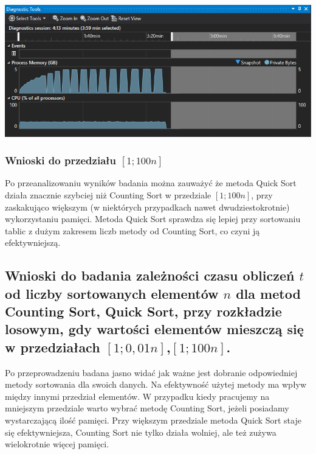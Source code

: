 \documentclass[polish,polish,a4paper]{article}
\begin{document}
\begin{spacing}{1.5}
\begin{minipage}[H]{\textwidth}
	\begin{center}
		\includegraphics[scale=0.85]{zad4pamiec100n.png}
		\label{fig:zad4pamiec100n}
	\end{center}
\end{minipage}



\subsubsection{Wnioski do przedziału $[1;100n]$}

Po przeanalizowaniu wyników badania można zauważyć że metoda Quick Sort działa znacznie szybciej niż Counting Sort w przedziale $[1;100n]$, przy zaskakująco większym (w niektórych przypadkach nawet dwudziestokrotnie) wykorzystaniu pamięci. Metoda Quick Sort sprawdza się lepiej przy sortowaniu tablic z dużym zakresem liczb metody od Counting Sort, co czyni ją efektywniejszą.


\subsection{Wnioski do badania zależności czasu obliczeń $t$ od liczby sortowanych elementów $n$ dla metod Counting Sort, Quick Sort, przy rozkładzie losowym, gdy wartości elementów mieszczą się w przedziałach  $ [1;0,01n] $,$ [1;100n] $. }

Po przeprowadzeniu badana jasno widać jak ważne jest dobranie odpowiedniej metody sortowania dla swoich danych. Na efektywność użytej metody ma wpływ między innymi przedział elementów. W przypadku kiedy pracujemy na mniejszym przedziale warto wybrać metodę Counting Sort, jeżeli posiadamy wystarczającą ilość pamięci. Przy większym przedziale metoda Quick Sort staje się efektywniejsza, Counting Sort nie tylko działa wolniej, ale też zużywa wielokrotnie więcej pamięci.
	

	
\end{spacing}
	\newpage
	\tableofcontents
\end{document}
